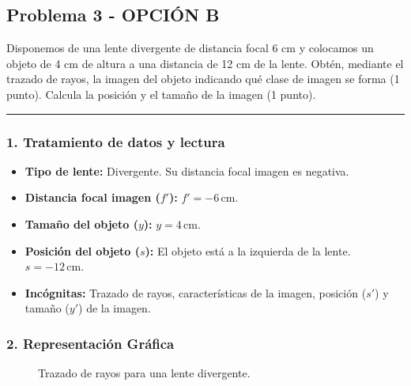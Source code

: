 \newpage

\subsection{Problema 3 - OPCIÓN B}
\label{subsec:3B_2009_sep_ext}

\begin{cajaenunciado}
Disponemos de una lente divergente de distancia focal 6 cm y colocamos un objeto de 4 cm de altura a una distancia de 12 cm de la lente. Obtén, mediante el trazado de rayos, la imagen del objeto indicando qué clase de imagen se forma (1 punto). Calcula la posición y el tamaño de la imagen (1 punto).
\end{cajaenunciado}
\hrule

\subsubsection*{1. Tratamiento de datos y lectura}
\begin{itemize}
    \item \textbf{Tipo de lente:} Divergente. Su distancia focal imagen es negativa.
    \item \textbf{Distancia focal imagen ($f'$):} $f' = -6 \, \text{cm}$.
    \item \textbf{Tamaño del objeto ($y$):} $y = 4 \, \text{cm}$.
    \item \textbf{Posición del objeto ($s$):} El objeto está a la izquierda de la lente. $s = -12 \, \text{cm}$.
    \item \textbf{Incógnitas:} Trazado de rayos, características de la imagen, posición ($s'$) y tamaño ($y'$) de la imagen.
\end{itemize}

\subsubsection*{2. Representación Gráfica}
\begin{figure}[H]
    \centering
    \caption{Trazado de rayos para una lente divergente.}
\end{figure}

